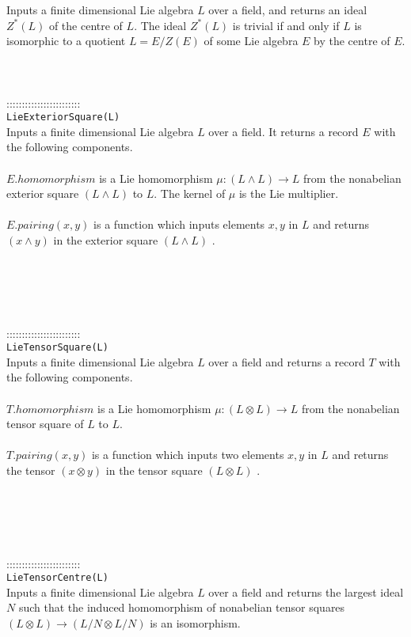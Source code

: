 \documentclass[a4paper,11pt]{report}
\begin{document}
{ Inputs a finite dimensional Lie algebra $L$ over a field, and returns an ideal $Z^\ast(L)$ of the centre of $L$. The ideal $Z^\ast(L)$ is trivial if and only if $L$ is isomorphic to a quotient $L=E/Z(E)$ of some Lie algebra $E$ by the centre of $E$. \\
 \\
 \\
 \\
 ::::::::::::::::::::::::\\
 \texttt{LieExteriorSquare(L) }\\
 

 Inputs a finite dimensional Lie algebra $L$ over a field. It returns a record $E$ with the following components. \\
 \\
 $E.homomorphism$ is a Lie homomorphism ${\ensuremath{\mu}} : (L \wedge L) \longrightarrow L$ from the nonabelian exterior square $(L \wedge L)$ to $L$. The kernel of ${\ensuremath{\mu}}$ is the Lie multiplier. \\
 \\
 $E.pairing(x,y)$ is a function which inputs elements $x, y$ in $L$ and returns $(x \wedge y)$ in the exterior square $(L \wedge L)$ . \\
 \\
 \\
 \\
 \\
 \\
 ::::::::::::::::::::::::\\
 \texttt{LieTensorSquare(L) }\\
 

 Inputs a finite dimensional Lie algebra $L$ over a field and returns a record $T$ with the following components. \\
 \\
 $T.homomorphism$ is a Lie homomorphism ${\ensuremath{\mu}} : (L \otimes L) \longrightarrow L$ from the nonabelian tensor square of $L$ to $L$. \\
 \\
 $T.pairing(x,y)$ is a function which inputs two elements $x, y$ in $L$ and returns the tensor $(x \otimes y)$ in the tensor square $(L \otimes L)$ . \\
 \\
 \\
 \\
 \\
 \\
 ::::::::::::::::::::::::\\
 \texttt{LieTensorCentre(L) }\\
 

 Inputs a finite dimensional Lie algebra $L$ over a field and returns the largest ideal $N$ such that the induced homomorphism of nonabelian tensor squares $(L \otimes L) \longrightarrow (L/N \otimes L/N)$ is an isomorphism. \\
 \\
 \\
 }
\end{document}
